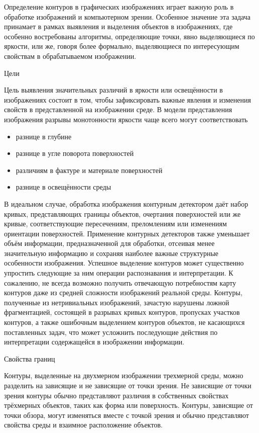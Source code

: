 \documentclass[a4paper,12pt]{report}
\begin{document}
Определение контуров в графических изображениях играет важную роль в обработке изображений и компьютерном зрении. Особенное значение эта задача принамает в рамках выявления и выделения объектов в изображениях, где особенно востребованы алгоритмы, определяющие точки, явно выделяющиеся по яркости, или же, говоря более формально, выделяющиеся по интересующим свойствам в обрабатываемом изображении.

\Large{Цели}

\normalsize
Цель выявления значительных различий в яркости или освещённости в изображениях состоит в том, чтобы зафиксировать важные явления и изменения свойств в представленной на изображении среде. В модели представления изображения разрывы монотонности яркости чаще всего могут соответствовать

\begin{itemize}
\item{разнице в глубине}
\item{разнице в угле поворота поверхностей}
\item{различиям в фактуре и материале поверхностей}
\item{разнице в освещённости среды} 
\end{itemize}

В идеальном случае, обработка изображения контурным детектором даёт набор кривых, представляющих границы объектов, очертания поверхностей или же кривые, соответствующие пересечениям, преломлениям или изменениям ориентации поверхностей. Применение контурных детекторов также уменьшает объём информации, предназначенной для обработки, отсеивая менее значительную информацию и сохраняя наиболее важные структурные особенности изображения. Успешное выделение контуров может существенно упростить следующие за ним операции распознавания и интерпретации. К сожалению, не всегда возможно получить отвечающую потребностям карту контуров даже из средней сложности изображений реальной среды. Контуры, полученные из нетривиальных изображений, зачастую нарушены ложной фрагментацией, состоящей в разрывах кривых контуров, пропусках участков контуров, а также ошибочным выделением контуров объектов, не касающихся поставленных задач, что может усложнить последующие действия по интерпретации содержащейся в изображении информации.

\Large{Свойства границ}

\normalsize Контуры, выделенные на двухмерном изображении трехмерной среды, можно разделить на зависящие и не зависящие от точки зрения. Не зависящие от точки зрения контуры обычно представляют различия в собственных свойствах трёхмерных объектов, таких как форма или поверхность. Контуры, зависящие от точки обзора, могут изменяться вместе с точкой зрения и обычно представляют свойства среды и взаимное расположение объектов.
 
\end{document}
